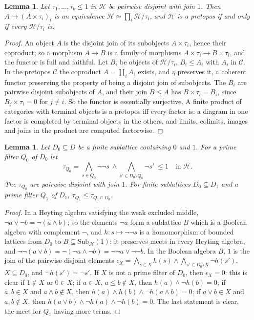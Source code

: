 \documentclass[11pt]{amsart}
\newtheorem{lem}[thm]{Lemma}
\theoremstyle{definition}
\newcommand{\Sub}{\mathrm{Sub}}
\newcommand{\cC}{\mathcal C}
\newcommand{\cH}{\mathcal H}
\begin{document}
\begin{lem}\label{lem:prod}
Let $\tau_1,\dots,\tau_k\le1$ in $\cH$ be pairwise disjoint with join
$1$. Then $A\mapsto(A\times\tau_i)_i$ is an equivalence
$\cH\simeq\prod_i\cH/\tau_i$, and $\cH$ is a pretopos if and only if
every $\cH/\tau_i$ is.
\end{lem}
\begin{proof}
An object $A$ is the disjoint join of its subobjects $A\times\tau_i$,
hence their coproduct; so a morphism $A\to B$ is a family of morphisms
$A\times\tau_i\to B\times\tau_i$, and the functor is full and
faithful. Let $B_i$ be objects of $\cH/\tau_i$, $B_i\le A_i$ with
$A_i$ in $\cC$. In the pretopos $\cC$ the coproduct $A=\coprod_iA_i$
exists, and $\eta$ preserves it, a coherent functor preserving the
property of being a disjoint join of subobjects. The $B_i$ are
pairwise disjoint subobjects of $A$, and their join $B\le A$ has
$B\times\tau_i=B_i$, since $B_j\times\tau_i=0$ for $j\ne i$. So the
functor is essentially surjective. A finite product of categories with
terminal objects is a pretopos iff every factor is: a diagram in one
factor is completed by terminal objects in the others, and limits,
colimits, images and joins in the product are computed factorwise.
\end{proof}

\begin{lem}\label{lem:partition}
Let $D_0\subseteq D$ be a finite sublattice containing $0$ and $1$.
For a prime filter $Q_0$ of $D_0$ let
\[
\tau_{Q_0}=\bigwedge_{s\in Q_0}\neg\neg s\ \wedge\bigwedge_{s'\in
D_0\setminus Q_0}\neg s'\ \le1\quad\text{in }\cH.
\]
The $\tau_{Q_0}$ are pairwise disjoint with join $1$. For finite
sublattices $D_0\subseteq D_1$ and a prime filter $Q_1$ of $D_1$,
$\tau_{Q_1}\le\tau_{Q_1\cap D_0}$.
\end{lem}
\begin{proof}
In a Heyting algebra satisfying the weak excluded middle, $\neg
a\vee\neg b=\neg(a\wedge b)$; so the elements $\neg a$ form a
sublattice $B$ which is a Boolean algebra with complement $\neg$, and
$h\colon s\mapsto\neg\neg s$ is a homomorphism of bounded lattices
from $D_0$ to $B\subseteq\Sub_\cH(1)$: it preserves meets in every
Heyting algebra, and $\neg\neg(a\vee b)=\neg(\neg a\wedge\neg
b)=\neg\neg a\vee\neg\neg b$. In the Boolean algebra $B$, $1$ is the
join of the pairwise disjoint elements $\epsilon_X=\bigwedge_{s\in
X}h(s)\wedge\bigwedge_{s'\in D_0\setminus X}\neg h(s')$,
$X\subseteq D_0$, and $\neg h(s')=\neg s'$. If $X$ is not a prime
filter of $D_0$, then $\epsilon_X=0$: this is clear if $1\notin X$ or
$0\in X$; if $a\in X$, $a\le b\notin X$, then $h(a)\wedge\neg h(b)=0$;
if $a,b\in X$ and $a\wedge b\notin X$, then $h(a)\wedge h(b)\wedge\neg
h(a\wedge b)=0$; if $a\vee b\in X$ and $a,b\notin X$, then $h(a\vee
b)\wedge\neg h(a)\wedge\neg h(b)=0$. The last statement is clear, the
meet for $Q_1$ having more terms.
\end{proof}
\end{document}
